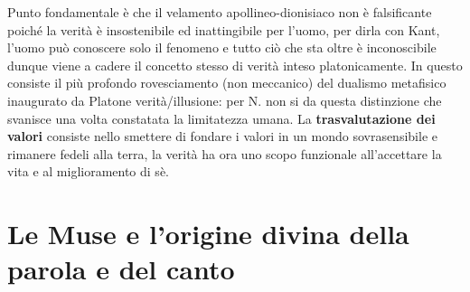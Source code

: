 \documentclass[10pt,a4paper]{article}
\begin{document}
Punto fondamentale è che il velamento apollineo-dionisiaco non è falsificante poiché la verità è insostenibile ed inattingibile per l'uomo, per dirla con Kant, l'uomo può conoscere solo il fenomeno e tutto ciò che sta oltre è inconoscibile dunque viene a cadere il concetto stesso di verità inteso platonicamente. In questo consiste il più profondo rovesciamento (non meccanico) del dualismo metafisico inaugurato da Platone verità/illusione: per N. non si da questa distinzione che svanisce una volta constatata la limitatezza umana. La \textbf{trasvalutazione dei valori} consiste nello smettere di fondare i valori in un mondo sovrasensibile e rimanere fedeli alla terra, la verità ha ora uno scopo funzionale all'accettare la vita e al miglioramento di sè.
\newpage
\section{Le Muse e l'origine divina della parola e del canto}
\end{document}
